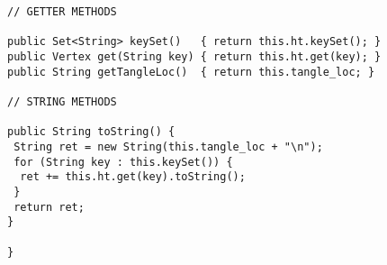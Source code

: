 \begin{Verbatim}
// GETTER METHODS

public Set<String> keySet()   { return this.ht.keySet(); }
public Vertex get(String key) { return this.ht.get(key); }
public String getTangleLoc()  { return this.tangle_loc; }

// STRING METHODS

public String toString() {
 String ret = new String(this.tangle_loc + "\n");
 for (String key : this.keySet()) {
  ret += this.ht.get(key).toString();
 }
 return ret;
}

}



\end{Verbatim}
